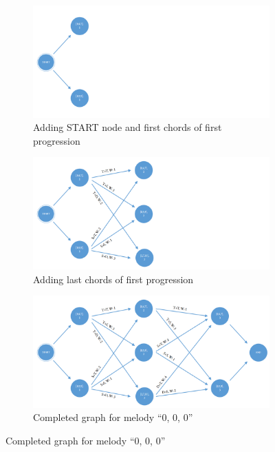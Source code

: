 \begin{figure}
\centering
\begin{subfigure}[b]{0.70\textwidth}
   \includegraphics[width=\linewidth]{Chapters/pic/41}
   \caption{Adding START node and first chords of first progression}
   \label{fig:41} 
\end{subfigure}

\begin{subfigure}[b]{0.70\textwidth}
   \includegraphics[width=\linewidth]{Chapters/pic/42}
   \caption{Adding last chords of first progression}
   \label{fig:42}
\end{subfigure}

\begin{subfigure}[b]{0.70\textwidth}
   \includegraphics[width=\linewidth]{Chapters/pic/43}
   \caption{Completed graph for melody ``0, 0, 0''}
   \label{fig:43}
\end{subfigure}


\end{figure}
